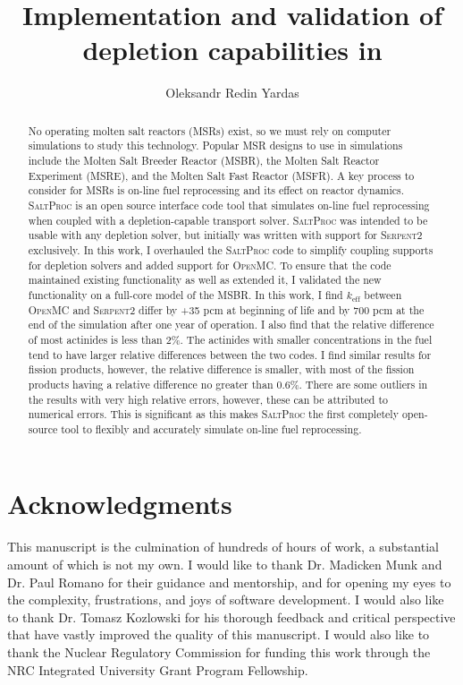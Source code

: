 \documentclass[edeposit,fullpage,hidelinks]{uiucthesis2018}
\title{Implementation and validation of \OpenMC depletion capabilities in \SaltProc}
\author{Oleksandr Redin Yardas}
\newcommand{\SaltProc}{\textsc{SaltProc}\xspace}
\newcommand{\OpenMC}{\textsc{OpenMC}\xspace}
\newcommand{\SerpentTWO}{\textsc{Serpent2}\xspace}
\begin{document}

\maketitle

\frontmatter
\begin{abstract}
No operating molten salt reactors (MSRs) exist, so we must rely on computer simulations
to study this technology. Popular MSR designs to use in simulations
include the Molten Salt Breeder Reactor (MSBR), the Molten Salt Reactor Experiment
(MSRE), and the Molten Salt Fast Reactor (MSFR). A key process to
consider for MSRs is on-line fuel reprocessing and its effect on reactor
dynamics. \SaltProc is an open source interface code tool that simulates on-line
fuel reprocessing when coupled with a depletion-capable transport solver.
\SaltProc was intended to be usable with any depletion solver, but initially was written
with support for \SerpentTWO exclusively. In this work, I overhauled the \SaltProc code
to simplify coupling supports for depletion solvers and added support for \OpenMC.
To ensure that the code maintained existing functionality as well as extended it, I
validated the new functionality on a full-core model of the MSBR. In this work, I find
$k_\text{eff}$ between \OpenMC and \SerpentTWO differ by +35 pcm at beginning of life
and by 700 pcm at the end of the simulation after one year of operation. I also find
that the relative difference of most actinides is less than 2\%. The actinides
with smaller concentrations in the fuel tend to have larger relative differences
between the two codes. I find similar results for fission products, however, the 
relative difference is smaller, with most of the fission products having a
relative difference no greater than 0.6\%. There are some outliers in the results
with very high relative errors, however, these can be attributed to numerical errors.
This is significant as this makes \SaltProc the first completely open-source tool to
flexibly and accurately simulate on-line fuel reprocessing.
\end{abstract}

\chapter*{Acknowledgments}

This manuscript is the culmination of hundreds of hours of work, a substantial
amount of which is not my own. I would like to thank Dr. Madicken Munk and Dr.
Paul Romano for their guidance and mentorship, and for opening my eyes to the
complexity, frustrations, and joys of software development. I would also like to
thank Dr. Tomasz Kozlowski for his thorough feedback and critical perspective
that have vastly improved the quality of this manuscript. I would also like to
thank the Nuclear Regulatory Commission for funding this work through the NRC
Integrated University Grant Program Fellowship.
\end{document}

